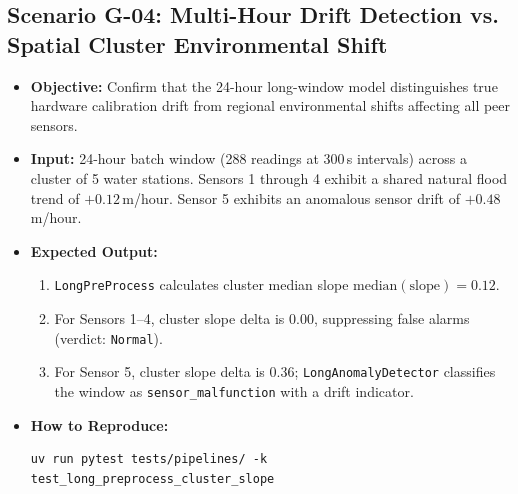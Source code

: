 \documentclass[11pt,a4paper]{article}
\begin{document}
\subsection{Scenario G-04: Multi-Hour Drift Detection vs. Spatial Cluster Environmental Shift}
\begin{itemize}[leftmargin=*,itemsep=1.5pt]
  \item \textbf{Objective:} Confirm that the 24-hour long-window model distinguishes true hardware calibration drift from regional environmental shifts affecting all peer sensors.
  \item \textbf{Input:} 24-hour batch window (288 readings at 300\,s intervals) across a cluster of 5 water stations. Sensors 1 through 4 exhibit a shared natural flood trend of $+0.12$\,m/hour. Sensor 5 exhibits an anomalous sensor drift of $+0.48$\,m/hour.
  \item \textbf{Expected Output:}
  \begin{enumerate}[label=\alph*.,leftmargin=1.5em]
    \item \texttt{LongPreProcess} calculates cluster median slope $\text{median}(\text{slope}) = 0.12$.
    \item For Sensors 1--4, cluster slope delta is $0.00$, suppressing false alarms (verdict: \texttt{Normal}).
    \item For Sensor 5, cluster slope delta is $0.36$; \texttt{LongAnomalyDetector} classifies the window as \texttt{sensor\_malfunction} with a drift indicator.
  \end{enumerate}
  \item \textbf{How to Reproduce:}
\begin{lstlisting}
uv run pytest tests/pipelines/ -k test_long_preprocess_cluster_slope
\end{lstlisting}
\end{itemize}
\end{document}
